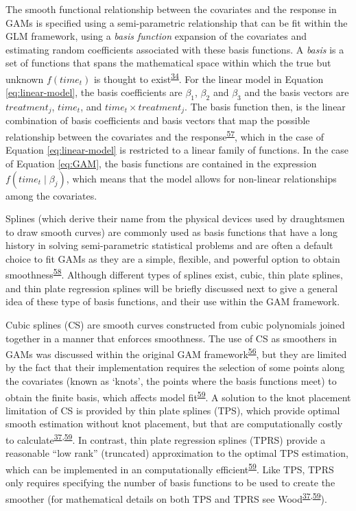 \documentclass[
]{article}
\begin{document}
The smooth functional relationship between the covariates and the response in GAMs is specified using a semi-parametric relationship that can be fit within the GLM framework, using a \emph{basis function} expansion of the covariates and estimating random coefficients associated with these basis functions. A \emph{basis} is a set of functions that spans the mathematical space within which the true but unknown \(f(time_t)\) is thought to exist\textsuperscript{\protect\hyperlink{ref-simpson2018}{34}}. For the linear model in Equation \eqref{eq:linear-model}, the basis coefficients are \(\beta_1\), \(\beta_2\) and \(\beta_3\) and the basis vectors are \(treatment_j\), \(time_t\), and \(time_t \times treatment_j\). The basis function then, is the linear combination of basis coefficients and basis vectors that map the possible relationship between the covariates and the response\textsuperscript{\protect\hyperlink{ref-hefley2017}{57}}, which in the case of Equation \eqref{eq:linear-model} is restricted to a linear family of functions. In the case of Equation \eqref{eq:GAM}, the basis functions are contained in the expression \(f(time_t\mid \beta_j)\), which means that the model allows for non-linear relationships among the covariates.

Splines (which derive their name from the physical devices used by draughtsmen to draw smooth curves) are commonly used as basis functions that have a long history in solving semi-parametric statistical problems and are often a default choice to fit GAMs as they are a simple, flexible, and powerful option to obtain smoothness\textsuperscript{\protect\hyperlink{ref-wegman1983}{58}}. Although different types of splines exist, cubic, thin plate splines, and thin plate regression splines will be briefly discussed next to give a general idea of these type of basis functions, and their use within the GAM framework.

Cubic splines (CS) are smooth curves constructed from cubic polynomials joined together in a manner that enforces smoothness. The use of CS as smoothers in GAMs was discussed within the original GAM framework\textsuperscript{\protect\hyperlink{ref-hastie1987}{56}}, but they are limited by the fact that their implementation requires the selection of some points along the covariates (known as `knots', the points where the basis functions meet) to obtain the finite basis, which affects model fit\textsuperscript{\protect\hyperlink{ref-wood2003}{59}}. A solution to the knot placement limitation of CS is provided by thin plate splines (TPS), which provide optimal smooth estimation without knot placement, but that are computationally costly to calculate\textsuperscript{\protect\hyperlink{ref-wood2017}{37},\protect\hyperlink{ref-wood2003}{59}}. In contrast, thin plate regression splines (TPRS) provide a reasonable ``low rank'' (truncated) approximation to the optimal TPS estimation, which can be implemented in an computationally efficient\textsuperscript{\protect\hyperlink{ref-wood2003}{59}}. Like TPS, TPRS only requires specifying the number of basis functions to be used to create the smoother (for mathematical details on both TPS and TPRS see Wood\textsuperscript{\protect\hyperlink{ref-wood2017}{37},\protect\hyperlink{ref-wood2003}{59}}).
\end{document}
